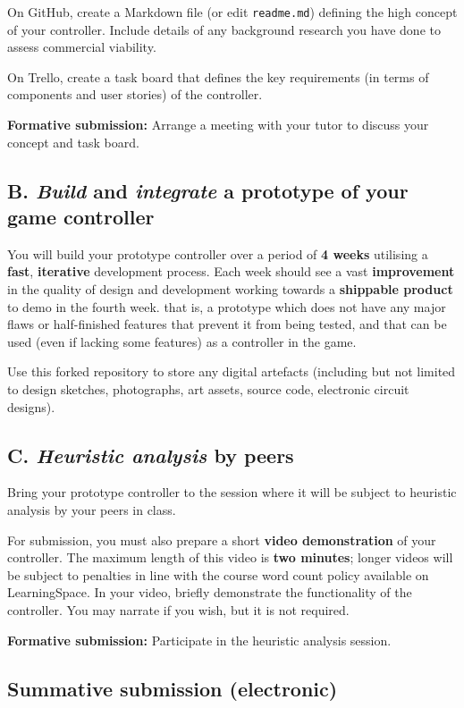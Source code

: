 \documentclass{../fal_assignment}
\begin{document}
On GitHub, create a Markdown file (or edit \texttt{readme.md})
defining the high concept of your controller.
Include details of any background research you have done to assess commercial viability.

On Trello, create a task board that defines the key requirements
(in terms of components and user stories) of the controller.

\textbf{Formative submission:} Arrange a meeting with your tutor to discuss your concept and task board.

\subsection*{B. \emph{Build} and  \emph{integrate} a prototype of your game controller}

You will build your prototype controller over a period of \textbf{4 weeks} utilising a \textbf{fast}, \textbf{iterative} development process.
Each week should see a vast \textbf{improvement} in the quality of design and development working towards a \textbf{shippable product} to demo in the fourth week. that is, a prototype which does not have any major flaws or half-finished features that prevent it from being tested, and that can be used (even if lacking some features) as a controller in the game.

Use this forked repository to store any digital artefacts (including but not limited to
design sketches, photographs, art assets, source code, electronic circuit designs).

\subsection*{C. \emph{Heuristic analysis} by peers}

Bring your prototype controller to the session where it will be subject to heuristic analysis by your peers in class.

For submission, you must also prepare a short \textbf{video demonstration} of your controller.
The maximum length of this video is \textbf{two minutes};
longer videos will be subject to penalties in line with the course word count policy available on LearningSpace.
In your video, briefly demonstrate the functionality of the controller.
You may narrate if you wish, but it is not required.

\textbf{Formative submission:} Participate in the heuristic analysis session.

\subsection*{Summative submission (electronic)}
\end{document}
